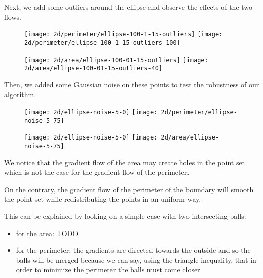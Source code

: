 Next, we add some outliers around the ellipse and observe the effects of the two
flows.

\begin{figure}[H]
    \centering

    \texttt{[image: 2d/perimeter/ellipse-100-1-15-outliers]}
    \texttt{[image: 2d/perimeter/ellipse-100-1-15-outliers-100]}
    \label{fig:ellipse_outliers_perimeter_flow}

    \texttt{[image: 2d/area/ellipse-100-01-15-outliers]}
    \texttt{[image: 2d/area/ellipse-100-01-15-outliers-40]}
    \label{fig:ellipse_outliers_area_flow}
\end{figure}

Then, we added some Gaussian noise on these points to test the robustness of our
algorithm.

\begin{figure}[H]
    \centering

    \texttt{[image: 2d/ellipse-noise-5-0]}
    \texttt{[image: 2d/perimeter/ellipse-noise-5-75]}
    \label{fig:ellipse_noise_perimeter_flow}

    \texttt{[image: 2d/ellipse-noise-5-0]}
    \texttt{[image: 2d/area/ellipse-noise-5-75]}
    \label{fig:ellipse_noise_area_flow}
\end{figure}

We notice that the gradient flow of the area may create holes in the point set
which is not the case for the gradient flow of the perimeter.

On the contrary, the gradient flow of the perimeter of the boundary will smooth
the point set while redistributing the points in an uniform way.

This can be explained by looking on a simple case with two intersecting balls:
\begin{itemize}
    \item for the area: TODO
    \item for the perimeter: the gradients are directed towards the outside
        and so the balls will be merged because we can say, using the triangle
        inequality, that in order to minimize the perimeter the balls must come
        closer.
\end{itemize}

